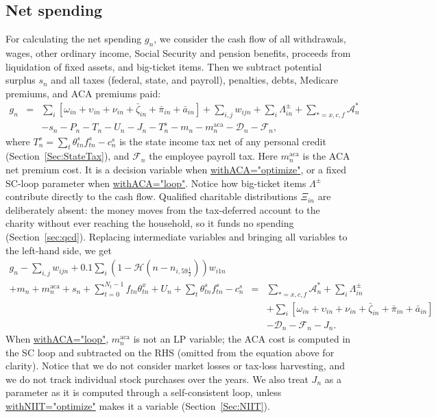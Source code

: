 \documentclass[fleqn,12pt]{report}
\newcommand{\code}[1]{\url{#1}}
\begin{document}
\subsection{Net spending}
\label{Sec:NetSpending}
	For calculating the net spending $g_n$, we consider the cash flow of all withdrawals,
	wages, other ordinary income, Social Security and pension benefits, proceeds from liquidation of fixed assets, and big-ticket items.
	Then we subtract potential surplus $s_{n}$ and all taxes (federal, state, and payroll), penalties, debts,
	Medicare premiums, and ACA premiums paid:
	\begin{eqnarray}
		g_n &=& \sum_i [\omega_{in} + \upsilon_{in} + \nu_{in} + \bar{\zeta}_{in} + \bar{\pi}_{in} + \bar{a}_{in} ]
		+ \sum_{i,j} w_{ijn} + \sum_i \Lambda^\pm_{in} + \sum_{*=x,c,f} \mathcal{A}_n^*  \nonumber \\
		&& - s_{n} - P_n - T_n - U_n - J_n - T^{s}_n - m_n - m^{\mathrm{aca}}_n - \mathcal{D}_n - \mathcal{F}_n,
	\end{eqnarray}
	where $T^{s}_n = \sum_t \theta^{s}_{tn} f^{s}_{tn} - c^{s}_n$ is the state income tax net of
	any personal credit (Section~\ref{Sec:StateTax}), and $\mathcal{F}_n$ the employee payroll tax.
	Here $m^{\mathrm{aca}}_n$ is the ACA net premium cost.
	It is a decision variable when \code{withACA="optimize"},
	or a fixed SC-loop parameter when \code{withACA="loop"}.
	Notice how big-ticket items $\Lambda^\pm$ contribute directly to the cash flow.
	Qualified charitable distributions $\Xi_{in}$ are deliberately absent: the money moves
	from the tax-deferred account to the charity without ever reaching the household,
	so it funds no spending (Section~\ref{sec:qcd}).
	Replacing intermediate variables and bringing all variables to the left-hand side, we get
	\begin{eqnarray}
		\label{Eq:C4}
		g_n - \sum_{i,j} w_{ijn} + 0.1 \sum_i (1-\mathcal{H}(n - n_{i,59\frac{1}{2}})) w_{i1n}\nonumber\\
                + m_n + m^{\mathrm{aca}}_n + s_n + \sum_{t=0}^{N_t-1} f_{tn} \theta^x_{tn} + U_n
                + \sum_t \theta^{s}_{tn} f^{s}_{tn} - c^{s}_n
		&=& \sum_{*=x,c,f} \mathcal{A}^*_n + \sum_i \Lambda^\pm_{in} \nonumber\\
                && + \sum_i [\omega_{in} + \upsilon_{in} + \nu_{in} + \bar{\zeta}_{in} + \bar{\pi}_{in} + \bar{a}_{in} ] \nonumber \\
                && - \mathcal{D}_n - \mathcal{F}_n - J_n.
	\end{eqnarray}
	When \code{withACA="loop"}, $m^{\mathrm{aca}}_n$ is not an LP variable; the ACA cost is
	computed in the SC loop and subtracted on the RHS (omitted from the equation above for clarity).
	Notice that we do not consider market losses or tax-loss harvesting,
	and we do not track individual stock purchases over the years.
	We also treat $J_n$ as a parameter as it is computed through a self-consistent loop,
	unless \code{withNIIT="optimize"} makes it a variable (Section~\ref{Sec:NIIT}).
\end{document}
